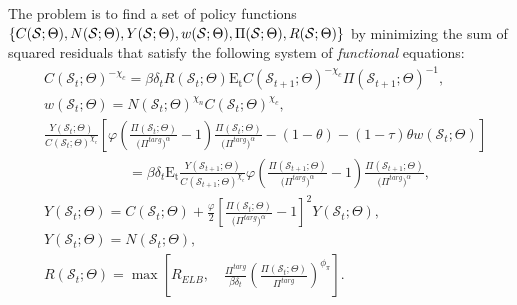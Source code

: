 \documentclass[11pt]{article}
\begin{document}
\begin{singlespace}
	    The problem is to find a set of policy functions $\{C(\mathcal{S};\Theta), N(\mathcal{S};\Theta), Y(\mathcal{S};\Theta), w(\mathcal{S};\Theta), \Pi(\mathcal{S};\Theta), \\ R(\mathcal{S};\Theta)\}$ by minimizing the sum of squared residuals that satisfy the following system of \emph{functional} equations: 
	    \begin{align}
		& C(\mathcal{S}_{t};\Theta)^{-\chi_{c}} = \beta\delta_{t}R(\mathcal{S}_{t};\Theta)\mathrm{E_{t}}C(\mathcal{S}_{t+1};\Theta)^{-\chi_{c}}\Pi(\mathcal{S}_{t+1};\Theta)^{-1},\\
		& w(\mathcal{S}_{t};\Theta)=N(\mathcal{S}_{t};\Theta)^{\chi_{n}}C(\mathcal{S}_{t};\Theta)^{\chi_{c}},\\
		& \frac{Y(\mathcal{S}_{t};\Theta)}{C(\mathcal{S}_{t};\Theta)^{\chi_{c}}}\left[\varphi \left(\frac{\Pi(\mathcal{S}_{t};\Theta)}{\bigl(\Pi^{targ}\bigr)^{\alpha}}-1\right)\frac{\Pi(\mathcal{S}_{t};\Theta)}{\bigl(\Pi^{targ}\bigr)^{\alpha}} - (1-\theta)- (1-\tau)\theta w(\mathcal{S}_{t};\Theta)\right]\\ \nonumber
		& \hspace{6em}= \beta\delta_{t}\mathrm{E_{t}}\frac{Y(\mathcal{S}_{t+1};\Theta)}{C(\mathcal{S}_{t+1};\Theta)^{\chi_{c}}}\varphi \left(\frac{\Pi(\mathcal{S}_{t+1};\Theta)}{\bigl(\Pi^{targ}\bigr)^{\alpha}}-1\right)\frac{\Pi(\mathcal{S}_{t+1};\Theta)}{\bigl(\Pi^{targ}\bigr)^{\alpha}},\\
		& Y(\mathcal{S}_{t};\Theta) = C(\mathcal{S}_{t};\Theta) + \frac{\varphi}{2}\left[\frac{\Pi(\mathcal{S}_{t};\Theta)}{\bigl(\Pi^{targ}\bigr)^{\alpha}}-1\right]^{2}Y(\mathcal{S}_{t};\Theta),\\
		& Y(\mathcal{S}_{t};\Theta)=N(\mathcal{S}_{t};\Theta),\\
		& R(\mathcal{S}_{t};\Theta) = \max \left[R_{ELB}, \quad\frac{\Pi^{targ}}{\beta\delta_t}\left(\frac{\Pi(\mathcal{S}_{t};\Theta)}{\Pi^{targ}}\right)^{\phi_{\pi}}\right].
	\end{align}
	

\end{singlespace}
\end{document}
